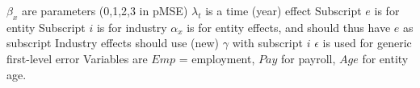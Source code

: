$\beta_x$ are parameters (0,1,2,3 in pMSE)
$\lambda_t$ is a time (year) effect
Subscript $e$ is for entity
Subscript $i$ is for industry
$\alpha_x$ is for entity effects, and should thus have $e$ as subscript
Industry effects should use (new) $\gamma$ with subscript $i$
$\epsilon$ is used for generic first-level error
Variables are $Emp$ = employment, $Pay$ for payroll, $Age$ for entity age.